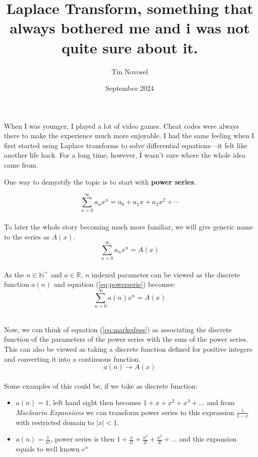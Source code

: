 \documentclass{article}
\title{Laplace Transform, something that always bothered me and i was not quite sure about it.}
\author{Tin Novosel}
\date{September 2024}
\begin{document}
\maketitle

When I was younger, I played a lot of video games. Cheat codes were always there to make the experience much more enjoyable. I had the same feeling when I first started using Laplace transforms to solve differential equations—it felt like another life hack. For a long time, however, I wasn’t sure where the whole idea came from.
\vspace{1cm}

\noindent One way to demystify the topic is to start with \textbf{power series}.

\begin{equation}
\label{eq:powerserie}
    \sum_{n=0}^{\infty} a_n x^n = a_0 + a_1 x + a_2 x^2 + \cdots
\end{equation}\\
 \noindent To later the whole story becoming much more familiar, we will give generic name to the series as $A(x)$.\\

 \begin{equation}
 \label{eq:markedps}
     \sum_{n=0}^{\infty} a_n x^n = A(x)
 \end{equation}\\

 \noindent As the $n \in \mathbb{N^+}$ and $a \in \mathbb{R}$, $n$ indexed parameter can be viewed as the discrete function $a(n)$ and equation (\ref{eq:powerserie}) becomes:\\
 
 \begin{equation}
 \label{eq:markedpss}
     \sum_{n=0}^{\infty} a(n) x^n = A(x)
 \end{equation}\\

\newpage

\noindent Now, we can think of equation (\ref{eq:markedpss}) as associating the discrete function of the parameters of the power series with the sum of the power series. This can also be viewed as taking a discrete function defined for positive integers and converting it into a continuous function.\\

\begin{equation}
    a(n) \rightarrow A(x)
\end{equation}
\\
Some examples of this could be, if we take as discrete function:
\begin{itemize}
    \item $a(n) = 1$, left hand sight then becomes $1 + x + x^2 + x^3 + ...$ and from \textit{Maclaurin Expansions} we can transform power series to this exprassion $\frac{1}{1-x}$ with restricted domain to $|x| < 1$.

    \item $a(n) = \frac{1}{n!}$, power series is then $1 + \frac{x}{1!} + \frac{x^2}{2!} + \frac{x^3}{3!} + ...$  and this expansion equals to well known $e^x$\\
    \\
\end{itemize}
\end{document}
